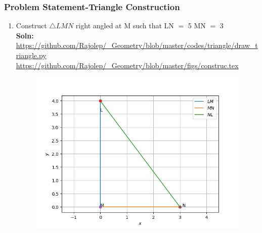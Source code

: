 \begin{frame}
\frametitle{Problem Statement-Triangle Construction}
\begin{enumerate}[label=(\roman*)]
\item Construct $\triangle LMN$ right angled at M such that LN $=$ 5  MN $=$ 3\\

\textbf{Soln:}\\
\url{https://github.com/Rajolep/_Geometry/blob/master/codes/triangle/draw_triangle.py}
\url{https://github.com/Rajolep/_Geometry/blob/master/figs/construc.tex}
\begin{figure}
\includegraphics[scale=0.2]{./figs/tricon.png}
\end{figure}
\end{enumerate}
\end{frame}